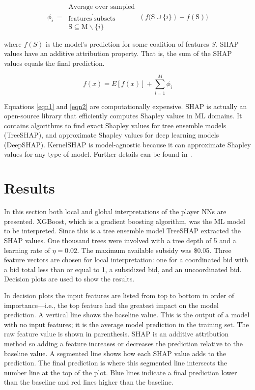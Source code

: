 \documentclass[journal]{IEEEtran} %
\begin{document}
\begin{equation}
    \phi_{i} \  =\  \begin{gathered}\text{Average over sampled}\\ \text{features}^{\prime }  \text{subsets}\\ \text{S} \subseteq \text{M} \backslash \{i\} \end{gathered} \  \left( f(\text{S} \cup \{ i\} \right)  -f\left( \text{S} \right)  )\label{eqn2}
\end{equation}

\noindent where $f(S)$ is the model's prediction for some coalition of features $S$.
SHAP values have an additive attribution property. That is, the sum of the SHAP values equals the final prediction\footnotemark.

\begin{equation}
f(x) = E\left[ f(x)\right]  +\sum^{M}_{i=1} \phi_{i}
    \label{eqn3}
\end{equation}



Equations \eqref{eqn1} and \eqref{eqn2} are computationally expensive. SHAP is actually an open-source library that efficiently computes Shapley values in ML domains. It contains algorithms to find exact Shapley values for tree ensemble models (TreeSHAP), and approximate Shapley values for deep learning models (DeepSHAP). KernelSHAP is model-agnostic because it can approximate Shapley values for any type of model. Further details can be found in~\cite{tree, shap}.

\section{Results}

In this section both local and global interpretations of the player NNs are presented. XGBoost, which is a gradient boosting algorithm, was the ML model to be interpreted. Since this is a tree ensemble model TreeSHAP extracted the SHAP values. One thousand trees were involved with a tree depth of 5 and a learning rate of $\eta=0.02$. The maximum available subsidy was \$0.05.
Three feature vectors are chosen for local interpretation: one for a coordinated bid with a bid total less than or equal to 1, a subsidized bid, and an uncoordinated bid. Decision plots are used to show the results.

In decision plots the input features are listed from top to bottom in order of importance---i.e., the top feature had the greatest impact on the model prediction. A vertical line shows the baseline value. This is the output of a model with no input features; it is the average model prediction in the training set. The raw feature value is shown in parenthesis.  SHAP is an additive attribution method so adding a feature increases or decreases the prediction relative to the baseline value. A segmented line shows how each SHAP value adds to the prediction. The final prediction is where this segmented line intersects the number line at the top of the plot. Blue lines indicate a final prediction lower than the baseline and red lines higher than the baseline. 
\end{document}
